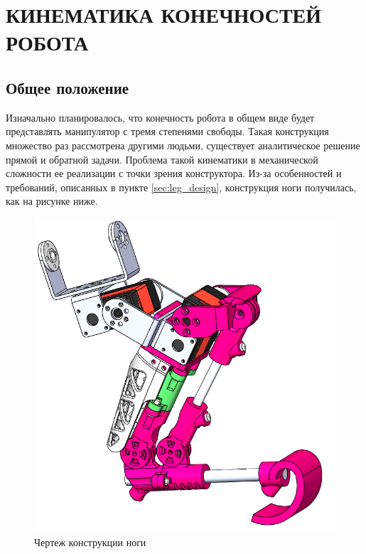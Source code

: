 \chapter{\MakeUppercase{Кинематика конечностей робота}}
\section{Общее положение} \label{sec:kin_general}
Изначально планировалось, что конечность робота в общем виде будет представлять манипулятор с тремя степенями свободы. Такая конструкция множество раз рассмотрена другими людьми, существует аналитическое решение прямой и обратной задачи. %
Проблема такой кинематики в механической сложности ее реализации с точки зрения конструктора. Из-за особенностей и требований, описанных в пункте \ref{sec:leg_design}, конструкция ноги получилась, как на рисунке ниже.
\begin{figure}[h]
    \centering
    \includegraphics[scale=0.5]{chapter_kinematics/figure2.png}
    \caption{Чертеж конструкции ноги}
    \label{}
\end{figure}

